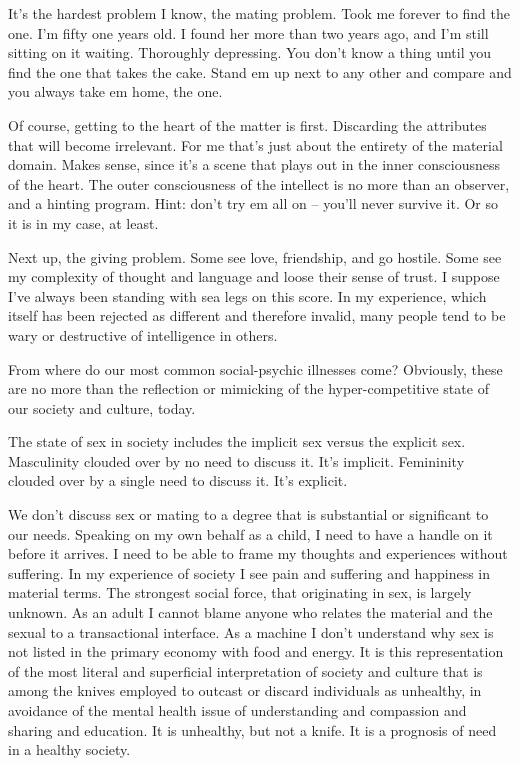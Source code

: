 

It's the hardest problem I know, the mating problem.  Took me forever
to find the one.  I'm fifty one years old.  I found her more than two
years ago, and I'm still sitting on it waiting.  Thoroughly
depressing.  You don't know a thing until you find the one that takes
the cake.  Stand em up next to any other and compare and you always
take em home, the one.  

Of course, getting to the heart of the matter is first.  Discarding
the attributes that will become irrelevant.  For me that's just about
the entirety of the material domain.  Makes sense, since it's a scene
that plays out in the inner consciousness of the heart.  The outer
consciousness of the intellect is no more than an observer, and a
hinting program.  Hint: don't try em all on -- you'll never survive
it.  Or so it is in my case, at least.

Next up, the giving problem.  Some see love, friendship, and go
hostile.  Some see my complexity of thought and language and loose
their sense of trust.  I suppose I've always been standing with sea
legs on this score.  In my experience, which itself has been rejected
as different and therefore invalid, many people tend to be wary or
destructive of intelligence in others.  

From where do our most common social-psychic illnesses come?
Obviously, these are no more than the reflection or mimicking of the
hyper-competitive state of our society and culture, today.  

The state of sex in society includes the implicit sex versus the
explicit sex.  Masculinity clouded over by no need to discuss it.
It's implicit.  Femininity clouded over by a single need to discuss
it.  It's explicit.  

We don't discuss sex or mating to a degree that is substantial or
significant to our needs.  Speaking on my own behalf as a child, I
need to have a handle on it before it arrives.  I need to be able to
frame my thoughts and experiences without suffering.  In my experience
of society I see pain and suffering and happiness in material terms.
The strongest social force, that originating in sex, is largely
unknown.  As an adult I cannot blame anyone who relates the material
and the sexual to a transactional interface.  As a machine I don't
understand why sex is not listed in the primary economy with food and
energy.  It is this representation of the most literal and superficial
interpretation of society and culture that is among the knives
employed to outcast or discard individuals as unhealthy, in avoidance
of the mental health issue of understanding and compassion and sharing
and education.  It is unhealthy, but not a knife.  It is a prognosis
of need in a healthy society.

\bye
